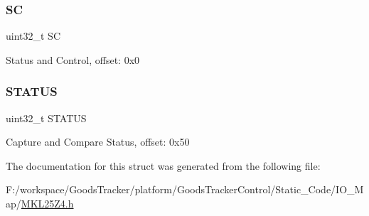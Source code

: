 \mbox{\label{struct_t_p_m___mem_map_aad171b536497d5fa1a596d4d1c620175}} 
\subsubsection{\texorpdfstring{SC}{SC}}
{\footnotesize\ttfamily uint32\+\_\+t SC}

Status and Control, offset\+: 0x0 \mbox{\label{struct_t_p_m___mem_map_a3f9158fbf21c247984a9c169ebe43143}} 
\subsubsection{\texorpdfstring{S\+T\+A\+T\+US}{STATUS}}
{\footnotesize\ttfamily uint32\+\_\+t S\+T\+A\+T\+US}

Capture and Compare Status, offset\+: 0x50 

The documentation for this struct was generated from the following file\+:\begin{DoxyCompactItemize}
\item 
F\+:/workspace/\+Goods\+Tracker/platform/\+Goods\+Tracker\+Control/\+Static\+\_\+\+Code/\+I\+O\+\_\+\+Map/\hyperlink{_m_k_l25_z4_8h}{M\+K\+L25\+Z4.\+h}\end{DoxyCompactItemize}
